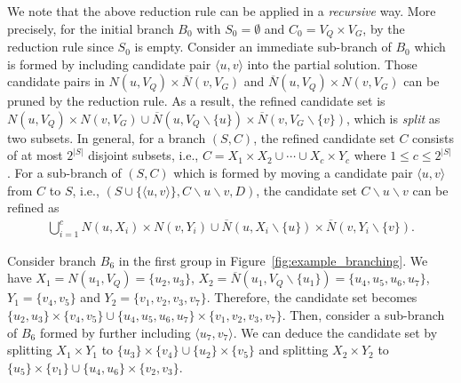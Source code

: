 {%
We note that the above reduction rule can be applied in a \emph{recursive} way. More precisely, for the initial branch $B_0$ with $S_0=\emptyset$ and $C_0= V_Q\times V_G $,  by the reduction rule since $S_0$ is empty. Consider an immediate sub-branch of $B_0$ which is formed by including candidate pair $\langle u,v \rangle$ into the partial solution. Those candidate pairs in $ N(u,V_Q)\times \overline{N}(v,V_G)$ and  $\overline{N}(u,V_Q)\times N(v,V_G)$ can be pruned by the reduction rule. As a result, the refined candidate set is $ N(u,V_Q)\times N(v,V_G) \cup  \overline{N}(u,V_Q\backslash\{u\})\times \overline{N}(v,V_G\backslash\{v\}) $, which is \emph{split} as two subsets. 
%
In general, for a branch $(S,C)$, the refined candidate set $C$ consists of at most $2^{|S|}$ disjoint subsets, i.e., $C=X_1\times X_2\cup\cdots\cup X_c\times Y_c$ where $1\leq c\leq 2^{|S|}$. For a sub-branch of $(S,C)$ which is formed by {\chengB moving} a candidate pair $\langle u,v \rangle$ from $C$ to $S$, i.e., $(S\cup\{\langle u,v \rangle\},C\backslash u \backslash v,D)$, the candidate set $C\backslash u \backslash v$ can be refined as
\begin{eqnarray}
    \label{eq:update_candidate_set}
    \bigcup_{i=1}^c  N(u,X_i)\times N(v,Y_i)  \cup  \overline{N}(u,X_i\backslash \{u\})\times \overline{N}(v, Y_i\backslash\{v\}). 
\end{eqnarray}
\fi
\begin{example}
    \label{exp:branching}
   Consider branch $B_6$ in the first group in Figure~\ref{fig:example_branching}. We have $X_1=N(u_1,V_Q)=\{u_2,u_3\}$, $X_2=\overline{N}(u_1,V_Q\backslash\{u_1\})=\{u_4,u_5,u_6,u_7\}$, $Y_1=\{v_4,v_5\}$ and $Y_2=\{v_1,v_2,v_3,v_7\}$. Therefore, the candidate set becomes $\{u_2,u_3\}\times \{v_4,v_5\}\cup\{u_4,u_5,u_6,u_7\}\times \{v_1,v_2,v_3,v_7\}$. Then, consider a sub-branch of $B_6$ formed by further including $\langle u_7,v_7 \rangle$. We can deduce the candidate set by splitting $X_1\times Y_1 $ to $\{u_3\}\times \{v_4\} \cup \{u_2\}\times \{v_5\} $ and splitting $ X_2\times Y_2$ to $\{u_5\}\times \{v_1\}\cup  \{u_4,u_6\}\times \{v_2,v_3\}$.
\end{example}
}





